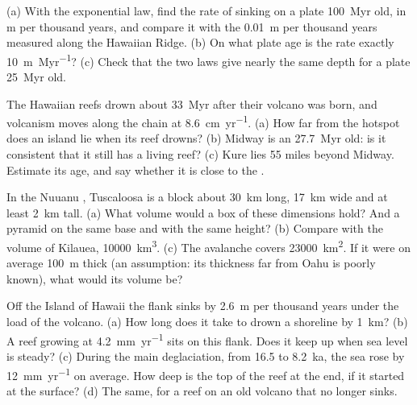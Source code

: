 \begin{exercise}[$\star\star$]\label{exo:b2:oceanic-islands:6}
(a) With the exponential law, find the rate of sinking on a plate \qty{100}{Myr} old, in \unit{m}
per thousand years, and compare it with the \qty{0.01}{m} per thousand years measured along the
Hawaiian Ridge. (b) On what plate age is the rate exactly \qty{10}{m.Myr^{-1}}? (c) Check that the
two laws give nearly the same depth for a plate \qty{25}{Myr} old.
\end{exercise}

\begin{exercise}[$\star\star$]\label{exo:b2:oceanic-islands:7}
The Hawaiian reefs drown about \qty{33}{Myr} after their volcano was born, and volcanism moves
along the chain at \qty{8.6}{cm.yr^{-1}}. (a) How far from the hotspot does an island lie when its
reef drowns? (b) Midway is an  \qty{27.7}{Myr} old: is it consistent that it still has a
living reef? (c) Kure lies 55 miles beyond Midway. Estimate its age, and say whether it is close
to the .
\end{exercise}

\begin{exercise}[$\star\star$]\label{exo:b2:oceanic-islands:8}
In the Nuuanu , Tuscaloosa  is a block about \qty{30}{km} long,
\qty{17}{km} wide and at least \qty{2}{km} tall. (a) What volume would a box of these dimensions
hold? And a pyramid on the same base and with the same height? (b) Compare with the volume of
Kilauea, \qty{10000}{km^3}. (c) The avalanche covers \qty{23000}{km^2}. If it were on average
\qty{100}{m} thick (an assumption: its thickness far from Oahu is poorly known), what would its
volume be?
\end{exercise}

\begin{exercise}[$\star\star$]\label{exo:b2:oceanic-islands:9}
Off the Island of Hawaii the flank sinks by \qty{2.6}{m} per thousand years under the load of the
volcano. (a) How long does it take to drown a shoreline by \qty{1}{km}? (b) A reef growing at
\qty{4.2}{mm.yr^{-1}} sits on this flank. Does it keep up when sea level is steady? (c) During the
main deglaciation, from 16.5 to \qty{8.2}{ka}, the sea rose by \qty{12}{mm.yr^{-1}} on average. How
deep is the top of the reef at the end, if it started at the surface? (d) The same, for a reef on
an old volcano that no longer sinks.
\end{exercise}

